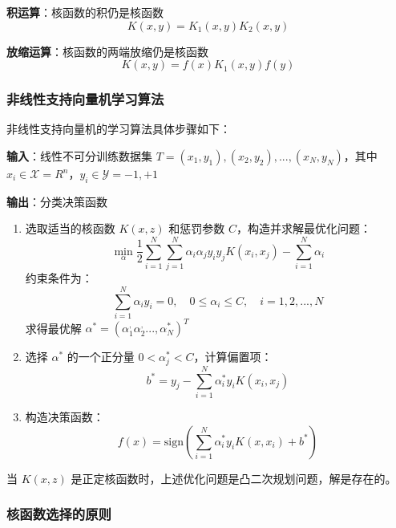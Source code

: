 \documentclass{article}
\newenvironment{solution_cn}{%
  \begin{proof}[解答]%
}{%
  \end{proof}%
}
\begin{document}
\begin{solution_cn}
\textbf{积运算}：核函数的积仍是核函数
\begin{equation}
K(x, y) = K_1(x, y)K_2(x, y)
\end{equation}

\textbf{放缩运算}：核函数的两端放缩仍是核函数
\begin{equation}
K(x, y) = f(x)K_1(x, y)f(y)
\end{equation}

\subsubsection{非线性支持向量机学习算法}

非线性支持向量机的学习算法具体步骤如下：

\textbf{输入}：线性不可分训练数据集 $T = {(x_1, y_1), (x_2, y_2), ..., (x_N, y_N)}$，其中 $x_i \in \mathcal{X} = R^n$，$y_i \in \mathcal{Y} = {-1, +1}$

\textbf{输出}：分类决策函数

\begin{enumerate}
\item 选取适当的核函数 $K(x, z)$ 和惩罚参数 $C$，构造并求解最优化问题：
\begin{equation}
\min_{\alpha} \frac{1}{2} \sum_{i=1}^N \sum_{j=1}^N \alpha_i \alpha_j y_i y_j K(x_i, x_j) - \sum_{i=1}^N \alpha_i
\end{equation}
约束条件为：
\begin{equation}
\sum_{i=1}^N \alpha_i y_i = 0, \quad 0 \leq \alpha_i \leq C, \quad i = 1, 2, ..., N
\end{equation}
求得最优解 $\alpha^* = (\alpha_1^, \alpha_2^, ..., \alpha_N^*)^T$

\item 选择 $\alpha^{*}$ 的一个正分量 $0 < \alpha_j^{*} < C$，计算偏置项：
\begin{equation}
b^* = y_j - \sum_{i=1}^N \alpha_i^* y_i K(x_i, x_j)
\end{equation}

\item 构造决策函数：
\begin{equation}
f(x) = \text{sign}\left(\sum_{i=1}^N \alpha_i^* y_i K(x, x_i) + b^*\right)
\end{equation}
\end{enumerate}

当 $K(x, z)$ 是正定核函数时，上述优化问题是凸二次规划问题，解是存在的。

\subsubsection{核函数选择的原则}


\end{solution_cn}
\end{document}
